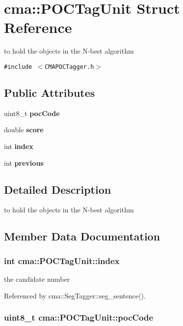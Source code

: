 \section{cma::POCTagUnit Struct Reference}
\label{structcma_1_1POCTagUnit}
to hold the objects in the N-best algorithm  


{\tt \#include $<$CMAPOCTagger.h$>$}

\subsection*{Public Attributes}
\begin{CompactItemize}
\item 
uint8\_\-t {\bf pocCode}
\item 
double {\bf score}
\item 
int {\bf index}
\item 
int {\bf previous}
\end{CompactItemize}


\subsection{Detailed Description}
to hold the objects in the N-best algorithm 

\subsection{Member Data Documentation}
\subsubsection[{index}]{\setlength{\rightskip}{0pt plus 5cm}int {\bf cma::POCTagUnit::index}}\label{structcma_1_1POCTagUnit_408429985543c203e36a6e8c6921935c}


the candidate number 

Referenced by cma::SegTagger::seg\_\-sentence().
\subsubsection[{pocCode}]{\setlength{\rightskip}{0pt plus 5cm}uint8\_\-t {\bf cma::POCTagUnit::pocCode}}\label{structcma_1_1POCTagUnit_a4a0e15baeb1ad18bbe2103284d5edb9}


